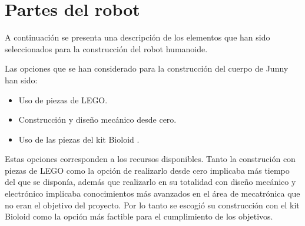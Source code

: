 

\section{Partes del robot}\label{sec:diseno}

A continuación se presenta una descripción de los elementos que han sido seleccionados para la construcción del robot humanoide. 

Las opciones que se han considerado para la construcci\'on del cuerpo de Junny han sido: 
\begin{itemize}
  \item Uso de piezas de \gls{LEGO}.
  \item Construcci\'on y dise\~no mec\'anico desde cero.
  \item Uso de las piezas del kit Bioloid \cite{robotics}.
\end{itemize}

Estas opciones corresponden a los recursos disponibles. Tanto la construci\'on con piezas de \gls{LEGO} como la opci\'on de realizarlo desde cero implicaba más tiempo del que se disponía, adem\'as que realizarlo en su totalidad con dise\~no mec\'anico y electr\'onico implicaba conocimientos m\'as avanzados en el \'area de mecatr\'onica que no eran el objetivo del proyecto. Por lo tanto se escogi\'o su construcci\'on con el kit Bioloid como la opci\'on m\'as factible para el cumplimiento de los objetivos. 

